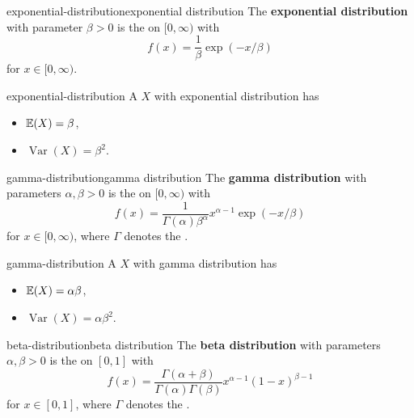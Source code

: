 \begin{topic}{exponential-distribution}{exponential distribution}
    The \textbf{exponential distribution} with parameter $\beta > 0$ is the  on $[0, \infty)$ with 
    \[ f(x) = \frac{1}{\beta} \exp(-x / \beta) \]
    for $x \in [0, \infty)$.
\end{topic}

\begin{example}{exponential-distribution}
    A  $X$ with exponential distribution has
    \begin{itemize}
        \item {} $\mathbb{E}(X) = \beta$,
        \item {} $\operatorname{Var}(X) = \beta^2$.
    \end{itemize}
\end{example}

\begin{topic}{gamma-distribution}{gamma distribution}
    The \textbf{gamma distribution} with parameters $\alpha, \beta > 0$ is the  on $[0, \infty)$ with 
    \[ f(x) = \frac{1}{\Gamma(\alpha) \beta^\alpha} x^{\alpha - 1} \exp(-x / \beta) \]
    for $x \in [0, \infty)$, where $\Gamma$ denotes the .
\end{topic}

\begin{example}{gamma-distribution}
    A  $X$ with gamma distribution has
    \begin{itemize}
        \item {} $\mathbb{E}(X) = \alpha \beta$,
        \item {} $\operatorname{Var}(X) = \alpha \beta^2$.
    \end{itemize}
\end{example}

\begin{topic}{beta-distribution}{beta distribution}
    The \textbf{beta distribution} with parameters $\alpha, \beta > 0$ is the  on $[0, 1]$ with 
    \[ f(x) = \frac{\Gamma(\alpha + \beta)}{\Gamma(\alpha) \Gamma(\beta)} x^{\alpha - 1} (1 - x)^{\beta - 1} \]
    for $x \in [0, 1]$, where $\Gamma$ denotes the .
\end{topic}

